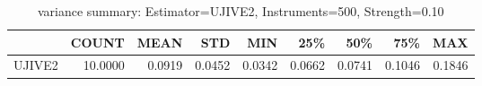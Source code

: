 \begin{table}[ht]
\centering
\caption{variance summary: Estimator=UJIVE2, Instruments=500, Strength=0.10}
\begin{tabular}{lrrrrrrrr}
\toprule
 & COUNT & MEAN & STD & MIN & 25\% & 50\% & 75\% & MAX \\
\midrule
UJIVE2 & 10.0000 & 0.0919 & 0.0452 & 0.0342 & 0.0662 & 0.0741 & 0.1046 & 0.1846 \\
\bottomrule
\end{tabular}
\end{table}
